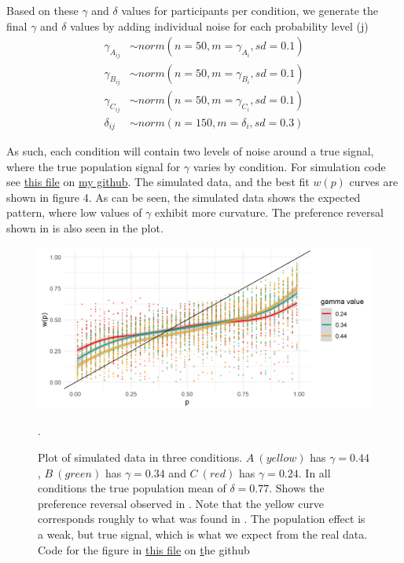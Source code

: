 \documentclass[12pt]{article}
\begin{document}
Based on these $\gamma$ and $\delta$ values for
participants per condition, we generate
the final $\gamma$ and $\delta$ values by
adding individual noise for each probability
level (j)
\begin{equation} \label{eq2}
\begin{split}
	\gamma_{A_{ij}} &\sim norm(n = 50,
	m = \gamma_{A_{i}}, sd = 0.1) \\
	\gamma_{B_{ij}} &\sim norm(n = 50,
	m = \gamma_{B_{i}}, sd = 0.1) \\
	\gamma_{C_{ij}} &\sim norm(n = 50,
	m = \gamma_{C_{i}}, sd = 0.1) \\
	\delta_{ij} &\sim norm(n = 150,
	m = \delta_{i}, sd = 0.3)
\end{split}
\end{equation}

As such, each condition will contain
two levels of noise around a true signal,
where the true population signal for
$\gamma$ varies by condition. For simulation
code see
\href{https://github.com/victor-m-p/BayesianDecisionWeights/blob/main/Code/1_simulate_data.Rmd}{this
file} on \href{https://github.com/victor-m-p/BayesianDecisionWeights}{my
github}.
The simulated data, and the best fit
$w(p)$ curves are shown in figure 4.
As can be seen, the simulated data shows
the expected pattern, where low values of
$\gamma$ exhibit more curvature. The preference
reversal shown in \textcite{rottenstreich2001money}
is also seen in the plot.

\begin{figure}[H]
	\includegraphics[width = \linewidth]{../Figures/simulated.png}
	\caption{Plot of simulated data in three
		conditions. $A \: (yellow)$ has
		$\gamma = 0.44$,
		$B \: (green)$ has $\gamma = 0.34$ and
		$C \: (red)$ has $\gamma = 0.24$.
		In all conditions
		the true population mean of
		$\delta = 0.77$. Shows the preference
		reversal observed in
	\textcite{rottenstreich2001money}. Note
	that the yellow curve corresponds
	roughly to what was found in
	\textcite{gonzalez1999shape}.
	The population effect is a
	weak, but true signal, which is
what we expect from the real data. {Code for the figure in
		\href{https://github.com/victor-m-p/BayesianDecisionWeights/blob/main/Code/2_check_simulated.Rmd}{this
		file} on
		\href{https://github.com/victor-m-p/BayesianDecisionWeights}
the github}}.
\end{figure}
\end{document}
